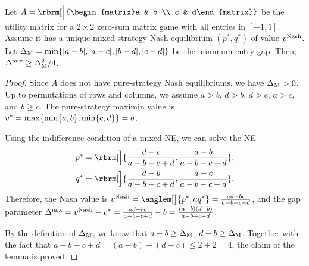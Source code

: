 



\begin{lemma}\label{lem:delta-comparison}
    Let $A=\rbrm[\Big]{\begin{matrix}a & b \\ c & d\end{matrix}}$ be the utility matrix for a $2\times 2$ zero-sum matrix game with all entries in $[-1, 1]$. Assume it has a unique mixed-strategy Nash equilibrium $(p^*,q^*)$ of value $v^{\mathrm{Nash}}$.
    Let $\Delta_{\mathrm{M}}=\min\{|a-b|,|a-c|,|b-d|,|c-d|\}$ be the minimum entry gap. Then, $\Delta^{\mkern-1mu\mathrm{mix}} \geq \Delta_{\mathrm{M}}^2/4$.
\end{lemma}
\begin{proof}
    Since $A$ does not have pure-strategy Nash equilibriums, we have $\Delta_{\mathrm{M}}>0$. Up to permutations of rows and columns, we assume $a>b$, $d>b$, $d>c$, $a>c$, and $b\geq c$. The pure-strategy maximin value is $v^*=\max\{\min\{a,b\},\min\{c,d\}\}=b$.

    Using the indifference condition of a mixed NE, we can solve the NE
    \begin{align*}
        p^* &= \rbrm[\Big]{\frac{d-c}{a-b-c+d},\frac{a-b}{a-b-c+d}},\\
        q^* &= \rbrm[\Big]{\frac{d-b}{a-b-c+d},\frac{a-c}{a-b-c+d}}.
    \end{align*}
    Therefore, the Nash value is $\vMix=\anglem[\big]{p^*,a q^*}=\frac{ad-bc}{a-b-c+d}$, and the gap parameter $\Delta^{\mkern-1mu\mathrm{mix}}=v^{\mathrm{Nash}}-v^*=\frac{ad-bc}{a-b-c+d}-b=\frac{(a-b)(d-b)}{a-b-c+d}$.

    By the definition of $\Delta_{\mathrm{M}}$, we know that $a-b\geq \Delta_{\mathrm{M}}$, $d-b\geq \Delta_{\mathrm{M}}$. Together with the fact that $a-b-c+d=(a-b)+(d-c)\leq 2+2=4$, the claim of the lemma is proved.
\end{proof}

